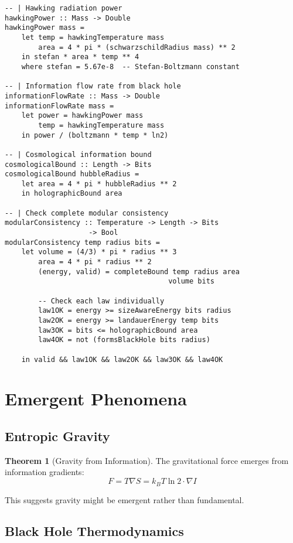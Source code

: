 \documentclass[11pt,a4paper]{article}
\theoremstyle{definition}
\newtheorem{theorem}{Theorem}[section]
\begin{document}
\begin{lstlisting}
-- | Hawking radiation power
hawkingPower :: Mass -> Double
hawkingPower mass =
    let temp = hawkingTemperature mass
        area = 4 * pi * (schwarzschildRadius mass) ** 2
    in stefan * area * temp ** 4
    where stefan = 5.67e-8  -- Stefan-Boltzmann constant

-- | Information flow rate from black hole
informationFlowRate :: Mass -> Double
informationFlowRate mass =
    let power = hawkingPower mass
        temp = hawkingTemperature mass
    in power / (boltzmann * temp * ln2)

-- | Cosmological information bound
cosmologicalBound :: Length -> Bits
cosmologicalBound hubbleRadius =
    let area = 4 * pi * hubbleRadius ** 2
    in holographicBound area

-- | Check complete modular consistency
modularConsistency :: Temperature -> Length -> Bits 
                    -> Bool
modularConsistency temp radius bits =
    let volume = (4/3) * pi * radius ** 3
        area = 4 * pi * radius ** 2
        (energy, valid) = completeBound temp radius area 
                                       volume bits
        
        -- Check each law individually
        law1OK = energy >= sizeAwareEnergy bits radius
        law2OK = energy >= landauerEnergy temp bits
        law3OK = bits <= holographicBound area
        law4OK = not (formsBlackHole bits radius)
        
    in valid && law1OK && law2OK && law3OK && law4OK
\end{lstlisting}

\section{Emergent Phenomena}

\subsection{Entropic Gravity}

\begin{theorem}[Gravity from Information]
The gravitational force emerges from information gradients:
\begin{equation}
F = T \nabla S = k_B T \ln 2 \cdot \nabla I
\end{equation}
\end{theorem}

This suggests gravity might be emergent rather than fundamental.

\subsection{Black Hole Thermodynamics}
\end{document}
